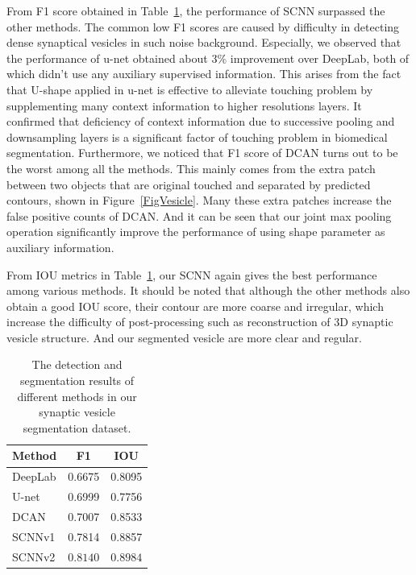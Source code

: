 From F1 score obtained in Table~\ref{tab:vesicle}, the performance of SCNN surpassed the other methods.
The common low F1 scores are caused by difficulty in detecting dense synaptical vesicles in such noise background.
Especially, we observed that the performance of u-net obtained about $3\%$ improvement over DeepLab, both of which didn't use any auxiliary supervised information.
This arises from the fact that U-shape applied in u-net is effective to alleviate touching problem by supplementing many context information to higher resolutions layers.
It confirmed that deficiency of context information due to successive pooling and downsampling layers is a significant factor of touching problem in biomedical segmentation.
Furthermore, we noticed that F1 score of DCAN turns out to be the worst among all the methods.
This mainly comes from the extra patch between two objects that are original touched and separated by predicted contours, shown in Figure~\ref{FigVesicle}.
Many these extra patches increase the false positive counts of DCAN.
And it can be seen that our joint max pooling operation significantly improve the performance of using shape parameter as auxiliary information.

From IOU metrics in Table~\ref{tab:vesicle}, our SCNN again gives the best performance among various methods.
It should be noted that although the other methods also obtain a good IOU score, their contour are more coarse and irregular, which increase the difficulty of post-processing such as reconstruction of 3D synaptic vesicle structure.
And our segmented vesicle are more clear and regular.


\begin{table}
\begin{center}
\begin{tabular}{lcc}
\hline
Method & F1 & IOU \\
\hline
DeepLab & 0.6675 & 0.8095 \\
U-net & 0.6999 & 0.7756 \\
DCAN & 0.7007 & 0.8533 \\
SCNNv1 & 0.7814 & 0.8857 \\
SCNNv2 & $\mathbf{0.8140}$ & $\mathbf{0.8984}$\\
\hline
\end{tabular}
\end{center}
\caption{The detection and segmentation results of different methods in our synaptic vesicle segmentation dataset.}
\label{tab:vesicle}
\end{table}





